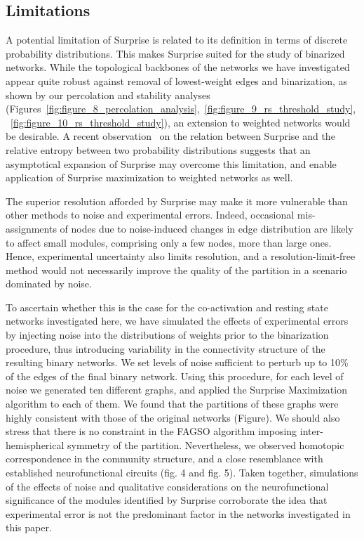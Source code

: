 \subsection{Limitations}

A potential limitation of Surprise is related to its definition in terms of discrete probability distributions. This makes Surprise suited for the study of binarized networks. While the topological backbones of the networks we have investigated appear quite robust against removal of lowest-weight edges and binarization, as shown by our percolation and stability analyses (Figures~\ref{fig:figure_8_percolation_analysis},~\ref{fig:figure_9_rs_threshold_study},~\ref{fig:figure_10_rs_threshold_study}), an extension to weighted networks would be desirable.
A recent observation~\cite{traag2015} on the relation between Surprise and the relative entropy between two probability distributions suggests that an asymptotical expansion of Surprise may overcome this limitation, and enable application of Surprise maximization to weighted networks as well.

The superior resolution afforded by Surprise may make it more vulnerable than other methods to noise and experimental errors. Indeed, occasional mis-assignments of nodes due to noise-induced changes in edge distribution are likely to affect small modules, comprising only a few nodes, more than large ones. Hence, experimental uncertainty also limits resolution, and a resolution-limit-free method would not necessarily improve the quality of the partition in a scenario dominated by noise. 

To ascertain whether this is the case for the co-activation and resting state networks investigated here, we have simulated the effects of experimental errors by injecting  noise into the distributions of weights prior to the binarization procedure, thus introducing variability in the connectivity structure of the resulting binary networks.
We set levels of noise sufficient to perturb up to 10\% of the edges of the final binary network. Using this procedure, for each level of noise we generated ten different graphs, and applied the Surprise Maximization algorithm to each of them.
We found that the partitions of these graphs were highly consistent with those of the original networks (Figure). We should also stress that there is no constraint in the FAGSO algorithm imposing inter-hemispherical symmetry of the partition. Nevertheless, we observed homotopic correspondence in the community structure, and a close resemblance with established neurofunctional circuits (fig. 4 and fig. 5).  Taken together, simulations of the effects of noise and qualitative considerations on the neurofunctional significance of the modules identified by Surprise corroborate the idea that experimental error is not the predominant factor in the networks investigated in this paper.

